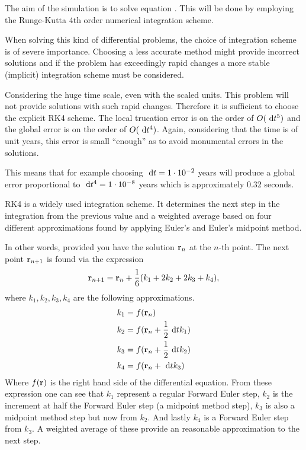 The aim of the simulation is to solve equation
. This will be done by employing the
Runge-Kutta 4th order numerical integration scheme.

When solving this kind of differential problems, the choice of
integration scheme is of severe importance. Choosing a less
accurate method might provide incorrect solutions and if the
problem has exceedingly rapid changes a more stable (implicit)
integration scheme must be considered.

Considering the huge time scale, even with the scaled units. This
problem will not provide solutions with such rapid changes.
Therefore it is sufficient to choose the explicit RK4 scheme. The
local trucation error is on the order of $O(\ \mathrm{d}t^5)$ and the global
error is on the order of $O(\ \mathrm{d}t^4)$. Again, considering that the
time is of unit years, this error is small ``enough'' as to avoid
monumental errors in the solutions.

This means that for example choosing $\ \mathrm{d}t = 1 \cdot 10^{-2}$ years
will produce a global error proportional to $\ \mathrm{d}t^4 = 1 \cdot
10^{-8}$ years which is approximately 0.32 seconds.

RK4 is a widely used integration scheme. It determines the next
step in the integration from the previous value and a weighted
average based on four different approximations found by applying
Euler's and Euler's midpoint method.

In other words, provided you have the solution $\mathbf{r}_n$ at the
$n$-th point. The next point $\mathbf{r}_{n+1}$ is found via the expression
\[ \mathbf{r}_{n+1} = \mathbf{r}_n + \frac{1}{6}(k_1 + 2k_2 + 2k_3 + k_4), \] where 
$k_1,k_2,k_3,k_4$ are the following approximations.
\begin{align*}
    k_1 &= f(\mathbf{r}_n) \\
    k_2 &= f(\mathbf{r}_n + \frac{1}{2}\ \mathrm{d}t k_1) \\
    k_3 &= f(\mathbf{r}_n + \frac{1}{2}\ \mathrm{d}t k_2) \\
    k_4 &= f(\mathbf{r}_n + \ \mathrm{d}t k_3)
\end{align*}
Where $f(\mathbf{r})$ is the right hand side of the differential equation.
From these expression one can see that $k_1$ represent a regular
Forward Euler step, $k_2$ is the increment at half the Forward
Euler step (a midpoint method step), $k_3$ is also a midpoint
method step but now from $k_2$. And lastly $k_4$ is a Forward Euler
step from $k_3$. A weighted average of these provide an reasonable
approximation to the next step.
%

